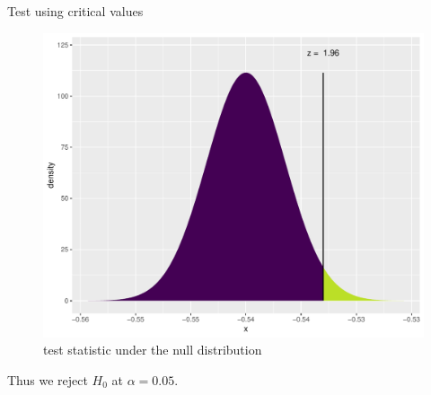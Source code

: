 \documentclass[10pt,handout]{beamer}\usepackage[]{graphicx}\usepackage[]{color}
\makeatletter
\def\maxwidth{ %
  \ifdim\Gin@nat@width>\linewidth
    \linewidth
  \else
    \Gin@nat@width
  \fi
}
\newenvironment{knitrout}{}{} %
\makeatother
\begin{document}
\begin{frame}[fragile]{Test using critical values}
\begin{minipage}{0.47\textwidth}
\begin{knitrout}
\begin{figure}
{\centering \includegraphics[width=\maxwidth]{figure/unnamed-chunk-5-1} 

}

\caption[test statistic under the null distribution]{test statistic under the null distribution}\label{fig:unnamed-chunk-5}
\end{figure}


\end{knitrout}
	\end{minipage}	
	
	Thus we reject $H_0$ at $\alpha = 0.05$.
\end{frame}
\end{document}
